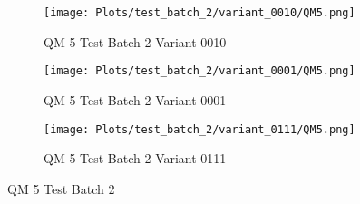 \documentclass{DissertateFigs}
\begin{document}
\begin{figure}[t!]
\medskip

    \begin{subfigure}{0.47\textwidth}
    \texttt{[image: Plots/test\_batch\_2/variant\_0010/QM5.png]}
    \caption{QM 5 Test Batch 2 Variant 0010}
    \end{subfigure}
    \begin{subfigure}{0.47\textwidth}
    \texttt{[image: Plots/test\_batch\_2/variant\_0001/QM5.png]}
    \caption{QM 5 Test Batch 2 Variant 0001}
    \end{subfigure}

\medskip

    \begin{subfigure}{0.47\textwidth}
    \texttt{[image: Plots/test\_batch\_2/variant\_0111/QM5.png]}
    \caption{QM 5 Test Batch 2 Variant 0111}
    \end{subfigure}
\caption{QM 5 Test Batch 2}
    \end{figure}
\clearpage
\end{document}
